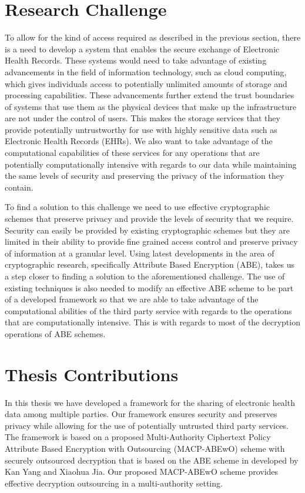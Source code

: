 \section{Research Challenge}

To allow for the kind of access required as described in the previous section, there is a need to develop a system that enables the secure exchange of Electronic Health Records. These systems would need to take advantage of existing advancements in the field of information technology, such as cloud computing, which gives individuals access to potentially unlimited amounts of storage and processing capabilities. These advancements further extend the trust boundaries of systems that use them as the physical devices that make up the infrastructure are not under the control of users. This makes the storage services that they provide potentially untrustworthy for use with highly sensitive data such as Electronic Health Records (EHRs). We also want to take advantage of the computational capabilities of these services for any operations that are potentially computationally intensive with regards to our data while maintaining the same levels of security and preserving the privacy of the information they contain.

To find a solution to this challenge we need to use effective cryptographic schemes that preserve privacy and provide the levels of security that we require. Security can easily be provided by existing cryptographic schemes but they are limited in their ability to provide fine grained access control and preserve privacy of information at a granular level. Using latest developments in the area of cryptographic research, specifically Attribute Based Encryption (ABE), takes us a step closer to finding a solution to the aforementioned challenge. The use of existing techniques is also needed to modify an effective ABE scheme to be part of a developed framework so that we are able to take advantage of the computational abilities of the third party service with regards to the operations that are computationally intensive. This is with regards to most of the decryption operations of ABE schemes.

\section{Thesis Contributions}

In this thesis we have developed a framework for the sharing of electronic health data among multiple parties. Our framework ensures security and preserves privacy while allowing for the use of potentially untrusted third party services. The framework is based on a proposed Multi-Authority Ciphertext Policy Attribute Based Encryption with Outsourcing (MACP-ABEwO) scheme with securely outsourced decryption that is based on the ABE scheme in developed by Kan Yang and Xiaohua Jia\cite{Yang2014}. Our proposed MACP-ABEwO scheme provides effective decryption outsourcing in a multi-authority setting.


